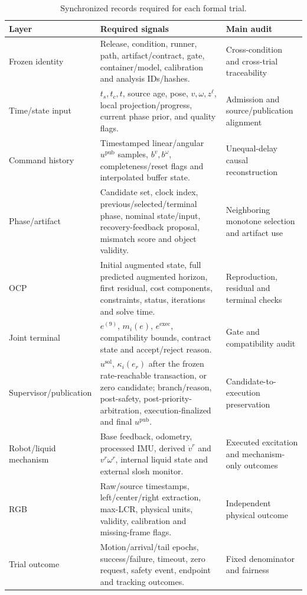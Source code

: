 \begin{table}[t]
  \centering
  \scriptsize
  \setlength{\tabcolsep}{4pt}
  \caption{Synchronized records required for each formal trial.}
  \label{tab:supp_recorded_signals}
  \begin{tabular}{@{}p{}p{}p{}@{}}
    \toprule
    Layer & Required signals & Main audit \\
    \midrule
    Frozen identity & Release, condition, runner, path, artifact/contract, gate,
      container/model, calibration and analysis IDs/hashes. & Cross-condition and
      cross-trial traceability \\
    Time/state input & $t_s,t_c,t$, source age, pose, $v,\omega,z^\ell$, local
      projection/progress, current phase prior, and quality flags. & Admission and
      source/publication alignment \\
    Command history & Timestamped linear/angular $u^{\mathrm{pub}}$ samples,
      $b^v,b^\omega$, completeness/reset flags and interpolated buffer state. &
      Unequal-delay causal reconstruction \\
    Phase/artifact & Candidate set, clock index, previous/selected/terminal phase,
      nominal state/input, recovery-feedback proposal, mismatch score and object
      validity. & Neighboring monotone selection and artifact use \\
    OCP & Initial augmented state, full predicted augmented horizon, first
      residual, cost components, constraints, status, iterations and solve time. &
      Reproduction, residual and terminal checks \\
    Joint terminal & $e^{(9)}$, $m_i(e)$, $e^{\mathrm{exec}}$, compatibility
      bounds, contract state and accept/reject reason. & Gate and compatibility
      audit \\
    Supervisor/publication & $u^{\mathrm{sol}}$,
      $\kappa_i(e_r)$ after the frozen rate-reachable transaction, or zero
      candidate; branch/reason, post-safety, post-priority-arbitration,
      execution-finalized and final
      $u^{\mathrm{pub}}$. & Candidate-to-execution preservation \\
    Robot/liquid mechanism & Base feedback, odometry, processed IMU, derived
      $\dot v^r$ and $v^r\omega^r$, internal liquid state and external slosh monitor. &
      Executed excitation and mechanism-only outcomes \\
    RGB & Raw/source timestamps, left/center/right extraction, max-LCR, physical
      units, validity, calibration and missing-frame flags. & Independent physical
      outcome \\
    Trial outcome & Motion/arrival/tail epochs, success/failure, timeout, zero
      request, safety event, endpoint and tracking outcomes. & Fixed denominator
      and fairness \\
    \bottomrule
  \end{tabular}
\end{table}

